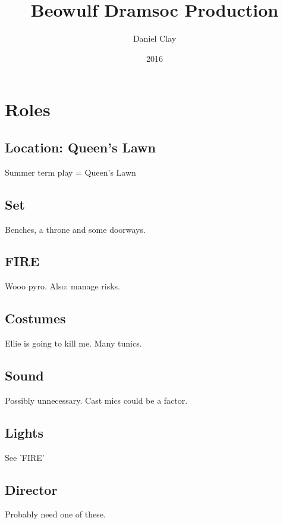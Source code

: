 \documentclass[a4paper]{article}
\begin{document}
\title{Beowulf Dramsoc Production}
\date{2016}
\author{
Daniel Clay \\ 
}
\maketitle

\section{Roles}

\subsection{Location: Queen's Lawn}%

Summer term play = Queen's Lawn

\subsection{Set}%

Benches, a throne and some doorways.

\subsection{FIRE}%

Wooo pyro. Also: manage risks.

\subsection{Costumes}%

Ellie is going to kill me. Many tunics.

\subsection{Sound}%

Possibly unnecessary. Cast mics could be a factor.

\subsection{Lights}%

See 'FIRE' 

\subsection{Director}%

Probably need one of these.
\end{document}

